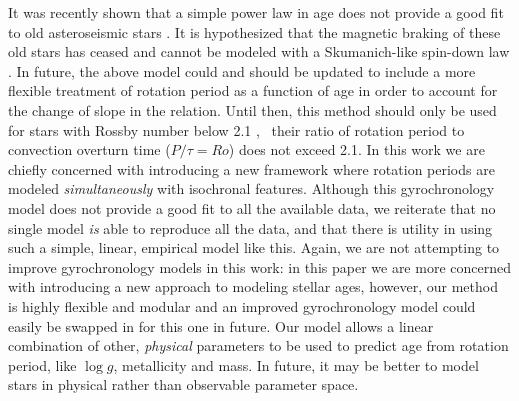 It was recently shown that a simple power law in age does not provide a good
fit to old asteroseismic stars \citep{angus2015, vansaders2016}.
It is hypothesized that the magnetic braking of these old stars has ceased and
cannot be modeled with a Skumanich-like spin-down law \citep{vansaders2016}.
In future, the above model could and should be updated to include a more
flexible treatment of rotation period as a function of age in order to account
for the change of slope in the relation.
Until then, this method should only be used for stars with Rossby number below
2.1 \citep{vansaders2016}, \ie\ their ratio of rotation period to convection
overturn time ($P/\tau = Ro$) does not exceed 2.1.
In this work we are chiefly concerned with introducing a new framework where
rotation periods are modeled {\it simultaneously} with isochronal features.
Although this gyrochronology model does not provide a good fit to all the
available data, we reiterate that no single model {\it is} able to reproduce
all the data, and that there is utility in using such a simple, linear,
empirical model like this.
Again, we are not attempting to improve gyrochronology models in this work: in
this paper we are more concerned with introducing a new approach to modeling
stellar ages, however, our method is highly flexible and modular and an
improved gyrochronology model could easily be swapped in for this one in
future.
Our model allows a linear combination of other, {\it physical} parameters to
be used to predict age from rotation period, like $\log g$, metallicity and
mass.
In future, it may be better to model stars in physical rather than observable
parameter space.

